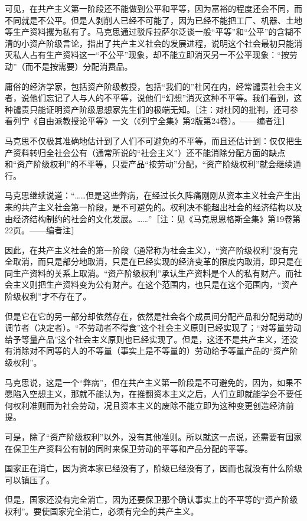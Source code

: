 \documentclass[UTF8, 12pt, a4paper]{ctexrep}
\begin{document}
可见，在共产主义第一阶段还不能做到公平和平等，因为富裕的程度还会不同，而不同就是不公平。但是人剥削人已经不可能了，因为已经不能把工厂、机器、土地等生产资料攫为私有了。马克思通过驳斥拉萨尔泛谈一般“平等”和“公平”的含糊不清的小资产阶级言论，指出了共产主义社会的发展进程，说明这个社会最初只能消灭私人占有生产资料这一“不公平”现象，却不能立即消灭另一不公平现象：“按劳动”（而不是按需要）分配消费品。

庸俗的经济学家，包括资产阶级教授，包括“我们的”杜冈在内，经常谴责社会主义者，说他们忘记了人与人的不平等，说他们“幻想”消灭这种不平等。我们看到，这种谴责只能证明资产阶级思想家先生们的极端无知。［注：对杜冈的批判，还可参看列宁《自由派教授论平等》一文（《列宁全集》第2版第24卷）。——编者注］

马克思不仅极其准确地估计到了人们不可避免的不平等，而且还估计到：仅仅把生产资料转归全社会公有（通常所说的“社会主义”）还不能消除分配方面的缺点和“资产阶级权利”的不平等，只要产品“按劳动”分配，“资产阶级权利”就会继续通行。

马克思继续说道：“……但是这些弊病，在经过长久阵痛刚刚从资本主义社会产生出来的共产主义社会第一阶段，是不可避免的。权利决不能超出社会的经济结构以及由经济结构制约的社会的文化发展。……”［注：见《马克思恩格斯全集》第19卷第22页。——编者注］

因此，在共产主义社会的第一阶段（通常称为社会主义），“资产阶级权利”没有完全取消，而只是部分地取消，只是在已经实现的经济变革的限度内取消，即只是在同生产资料的关系上取消。“资产阶级权利”承认生产资料是个人的私有财产。而社会主义则把生产资料变为公有财产。在这个范围内，也只是在这个范围内，“资产阶级权利”才不存在了。

但是它在它的另一部分却依然存在，依然是社会各个成员间分配产品和分配劳动的调节者（决定者）。“不劳动者不得食”这个社会主义原则已经实现了；“对等量劳动给予等量产品”这个社会主义原则也已经实现了。但是，这还不是共产主义，还没有消除对不同等的人的不等量（事实上是不等量的）劳动给予等量产品的“资产阶级权利”。

马克思说，这是一个“弊病”，但在共产主义第一阶段是不可避免的，因为，如果不愿陷入空想主义，那就不能认为，在推翻资本主义之后，人们立即就能学会不要任何权利准则而为社会劳动，况且资本主义的废除不能立即为这种变更创造经济前提。

可是，除了“资产阶级权利”以外，没有其他准则。所以就这一点说，还需要有国家在保卫生产资料公有制的同时来保卫劳动的平等和产品分配的平等。

国家正在消亡，因为资本家已经没有了，阶级已经没有了，因而也就没有什么阶级可以镇压了。

但是，国家还没有完全消亡，因为还要保卫那个确认事实上的不平等的“资产阶级权利”。要使国家完全消亡，必须有完全的共产主义。
\end{document}
